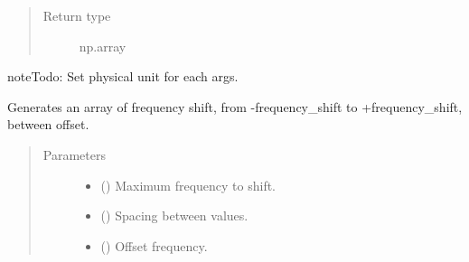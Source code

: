 \documentclass[a4paper,10pt,english]{sphinxmanual}
\begin{document}
\begin{fulllineitems}
\begin{quote}
\begin{description}
\begin{description}
\end{description}


\item[{Return type}] \leavevmode
np.array

\end{description}\end{quote}

\begin{sphinxadmonition}{note}{\label{autodoc/mrsprint/mrsprint.simulator:index-2}Todo:}
Set physical unit for each args.
\end{sphinxadmonition}

\end{fulllineitems}


\begin{fulllineitems}
\label{\detokenize{autodoc/mrsprint/mrsprint.simulator:mrsprint.simulator.frequency_shift}}
Generates an array of frequency shift, from -frequency\_shift to +frequency\_shift, between offset.
\begin{quote}\begin{description}
\item[{Parameters}] \leavevmode\begin{itemize}
\item {} 
 (\sphinxstyleliteralemphasis{\sphinxupquote{ {[}}}\sphinxstyleliteralemphasis{\sphinxupquote{{]}}}) \textendash{} Maximum frequency to shift.

\item {} 
 (\sphinxstyleliteralemphasis{\sphinxupquote{ {[}}}\sphinxstyleliteralemphasis{\sphinxupquote{{]}}}) \textendash{} Spacing between values.

\item {} 
 (\sphinxstyleliteralemphasis{\sphinxupquote{ {[}}}\sphinxstyleliteralemphasis{\sphinxupquote{{]}}}) \textendash{} Offset frequency.


\end{itemize}
\end{description}
\end{quote}
\end{fulllineitems}
\end{document}
